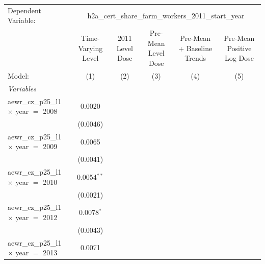
\begingroup
\centering
\begin{tabular}{lccccc}
   \tabularnewline \midrule \midrule
   Dependent Variable: & \multicolumn{5}{c}{h2a\_cert\_share\_farm\_workers\_2011\_start\_year}\\
                                                                & Time-Varying Level & 2011 Level Dose & Pre-Mean Level Dose   & Pre-Mean + Baseline Trends & Pre-Mean Positive Log Dose \\   
   Model:                                                       & (1)                & (2)             & (3)                   & (4)                        & (5)\\  
   \midrule
   \emph{Variables}\\
   aewr\_cz\_p25\_l1 $\times$ year $=$ 2008                     & 0.0020             &                 &                       &                            &   \\   
                                                                & (0.0046)           &                 &                       &                            &   \\   
   aewr\_cz\_p25\_l1 $\times$ year $=$ 2009                     & 0.0065             &                 &                       &                            &   \\   
                                                                & (0.0041)           &                 &                       &                            &   \\   
   aewr\_cz\_p25\_l1 $\times$ year $=$ 2010                     & 0.0054$^{**}$      &                 &                       &                            &   \\   
                                                                & (0.0021)           &                 &                       &                            &   \\   
   aewr\_cz\_p25\_l1 $\times$ year $=$ 2012                     & 0.0078$^{*}$       &                 &                       &                            &   \\   
                                                                & (0.0043)           &                 &                       &                            &   \\   
   aewr\_cz\_p25\_l1 $\times$ year $=$ 2013                     & 0.0071             &                 &                       &                            &   \\   

\end{tabular}
